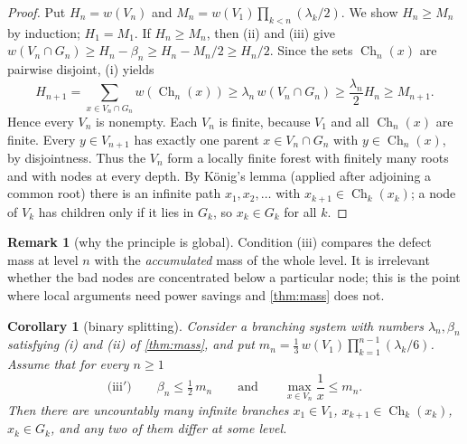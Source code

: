 \documentclass[11pt,a4paper]{article}
\newtheorem{corollary}[theorem]{Corollary}
\theoremstyle{definition}
\newtheorem{remark}[theorem]{Remark}
\newcommand{\Ch}{\operatorname{Ch}}
\begin{document}
\begin{proof}
Put $H_n=w(V_n)$ and $M_n=w(V_1)\prod_{k<n}(\lambda_k/2)$. We show $H_n\ge M_n$ by induction; $H_1=M_1$.
If $H_n\ge M_n$, then (ii) and (iii) give $w(V_n\cap G_n)\ge H_n-\beta_n\ge H_n-M_n/2\ge H_n/2$.
Since the sets $\Ch_n(x)$ are pairwise disjoint, (i) yields
\[
 H_{n+1}=\sum_{x\in V_n\cap G_n}w(\Ch_n(x))\ge\lambda_n\,w(V_n\cap G_n)\ge \frac{\lambda_n}{2}H_n\ge M_{n+1}.
\]
Hence every $V_n$ is nonempty. Each $V_n$ is finite, because $V_1$ and all $\Ch_n(x)$ are finite.
Every $y\in V_{n+1}$ has exactly one parent $x\in V_n\cap G_n$ with $y\in\Ch_n(x)$, by disjointness.
Thus the $V_n$ form a locally finite forest with finitely many roots and with nodes at every depth.
By König's lemma (applied after adjoining a common root) there is an infinite path
$x_1,x_2,\dots$ with $x_{k+1}\in\Ch_k(x_k)$; a node of $V_k$ has children only if it lies in $G_k$,
so $x_k\in G_k$ for all $k$.
\end{proof}

\begin{remark}[why the principle is global]
Condition (iii) compares the defect mass at level $n$ with the \emph{accumulated} mass of the whole level.
It is irrelevant whether the bad nodes are concentrated below a particular node; this is the point
where local arguments need power savings and \cref{thm:mass} does not.
\end{remark}

\begin{corollary}[binary splitting]\label{cor:split}
Consider a branching system with numbers $\lambda_n,\beta_n$ satisfying \textup{(i)} and \textup{(ii)} of
\cref{thm:mass}, and put $m_n=\frac13\,w(V_1)\prod_{k=1}^{n-1}(\lambda_k/6)$. Assume that for every $n\ge1$
\[
 \text{(iii$'$)}\qquad \beta_n\le\tfrac12\,m_n\qquad\text{and}\qquad \max_{x\in V_n}\frac1x\le m_n .
\]
Then there are uncountably many infinite branches $x_1\in V_1$, $x_{k+1}\in\Ch_k(x_k)$, $x_k\in G_k$, and any two
of them differ at some level.
\end{corollary}
\end{document}
